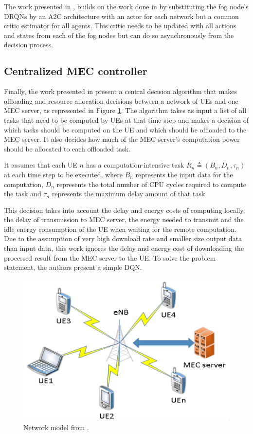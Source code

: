 The work presented in \cite{Lulu}, builds on the work done in \cite{fogmulti} by substituting the fog node's \acrshort{DRQN}s by an \acrshort{A2C} architecture with an actor for each network but a common critic estimator for all agents. This critic needs to be updated with all actions and states from each of the fog nodes but can do so asynchronously from the decision process.

\subsection{Centralized MEC controller}
\noindent Finally, the work presented in \cite{NUE1mec} present a central decision algorithm that makes offloading and resource allocation decisions between a network of \acrshort{UE}s and one \acrshort{MEC} server, as represented in Figure \ref{centralizedMECnetwork}. The algorithm takes as input a list of all tasks that need to be computed by \acrshort{UE}s at that time step and makes a decision of which tasks should be computed on the \acrshort{UE} and which should be offloaded to the \acrshort{MEC} server. It also decides how much of the \acrshort{MEC} server's computation power should be allocated to each offloaded task.

It assumes that each \acrshort{UE} $n$ has a computation-intensive task $R_n \triangleq (B_n, D_n, \tau_n)$ at each time step to be executed, where $B_n$ represents the input data for the computation, $D_n$ represents the total number of \acrshort{CPU} cycles required to compute the task and $\tau_n$ represents the maximum delay amount of that task.

This decision takes into account the delay and energy costs of computing locally, the delay of transmission to \acrshort{MEC} server, the energy needed to transmit and the idle energy consumption of the \acrshort{UE} when waiting for the remote computation. Due to the assumption of very high download rate and smaller size output data than input data, this work ignores the delay and energy cost of downloading the processed result from the \acrshort{MEC} server to the \acrshort{UE}. To solve the problem statement, the authors present a simple \acrshort{DQN}.

\begin{figure}[h]
  \centering
  \includegraphics[width=\linewidth]{images/centralizedMECnetwork.png}
  \caption{Network model from \cite{NUE1mec}.} \label{centralizedMECnetwork}
\end{figure}